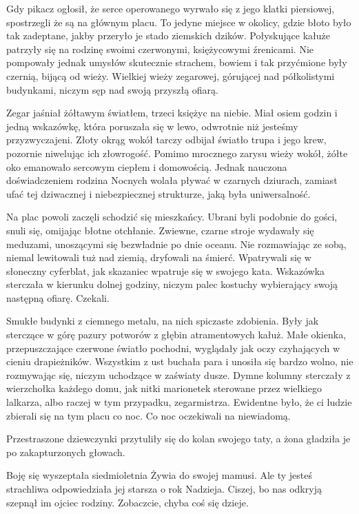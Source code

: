 Gdy pikacz ogłosił, że serce operowanego wyrwało się z jego klatki piersiowej, spostrzegli że są na głównym placu. 
To jedyne miejsce w okolicy, gdzie błoto było tak zadeptane, jakby przeryło je stado ziemskich dzików.
Połyskujące kałuże patrzyły się na rodzinę swoimi czerwonymi, księżycowymi źrenicami.
Nie pompowały jednak umysłów skutecznie strachem, bowiem i tak przyćmione były czernią, bijącą od wieży.
Wielkiej wieży zegarowej, górującej nad półkolistymi budynkami, niczym sęp nad swoją przyszłą ofiarą.

Zegar jaśniał żółtawym światłem, trzeci księżyc na niebie.
Miał osiem godzin i jedną wskazówkę, która poruszała się w lewo, odwrotnie niż jesteśmy przyzwyczajeni.
Złoty okrąg wokół tarczy odbijał światło trupa i jego krew, pozornie niwelując ich złowrogość.
Pomimo mrocznego zarysu wieży wokół, żółte oko emanowało sercowym ciepłem i domowością.
Jednak nauczona doświadczeniem rodzina Nocnych wolała pływać w czarnych dziurach, zamiast ufać tej dziwacznej i niebezpiecznej strukturze, jaką była uniwersalność.

Na plac powoli zaczęli schodzić się mieszkańcy.
Ubrani byli podobnie do gości, snuli się, omijając błotne otchłanie.
Zwiewne, czarne stroje wydawały się meduzami, unoszącymi się bezwładnie po dnie oceanu.
Nie rozmawiając ze sobą, niemal lewitowali tuż nad ziemią, dryfowali na śmierć.
Wpatrywali się w słoneczny cyferblat, jak skazaniec wpatruje się w swojego kata.
Wskazówka sterczała w kierunku dolnej godziny, niczym palec kostuchy wybierający swoją następną ofiarę.
Czekali.

Smukłe budynki z ciemnego metalu, na nich spiczaste zdobienia. 
Były jak sterczące w górę pazury potworów z głębin atramentowych kałuż.
Małe okienka, przepuszczające czerwone światło pochodni, wyglądały jak oczy czyhających w cieniu drapieżników.
Wszystkim z ust buchała para i unosiła się bardzo wolno, nie rozmywając się, niczym uchodzące w zaświaty dusze.
Dymne kolumny sterczały z wierzchołka każdego domu, jak nitki marionetek sterowane przez wielkiego lalkarza, albo raczej w tym przypadku, zegarmistrza.
Ewidentne było, że ci ludzie zbierali się na tym placu co noc.
Co noc oczekiwali na niewiadomą.

Przestraszone dziewczynki przytuliły się do kolan swojego taty, a żona gładziła je po zakapturzonych głowach.
\begin{dialogue}
	\ds{} Boję się \dm{} wyszeptała siedmioletnia Żywia do swojej mamusi.
	\ds{} Ale ty jesteś strachliwa \dm{} odpowiedziała jej starsza o rok Nadzieja.
	\ds{} Ciszej, bo nas odkryją \dm{} szepnął im ojciec rodziny. \dm{} Zobaczcie, chyba coś się dzieje.
\end{dialogue}

